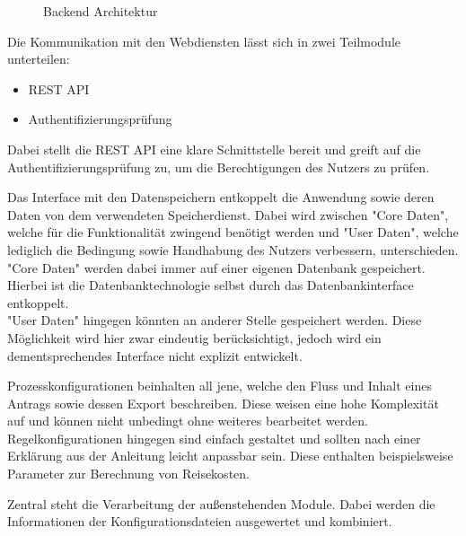 \begin{figure}[h]
    
    \caption{Backend Architektur}\label{fig:BackendArch}
\end{figure}

Die Kommunikation mit den Webdiensten lässt sich in zwei Teilmodule unterteilen:
\begin{itemize}
    \item \ac{REST} \ac{API}
    \item Authentifizierungsprüfung
\end{itemize}
Dabei stellt die \ac{REST} \ac{API} eine klare Schnittstelle bereit und greift auf die Authentifizierungsprüfung zu,
um die Berechtigungen des Nutzers zu prüfen.

Das Interface mit den Datenspeichern entkoppelt die Anwendung sowie deren Daten von dem verwendeten Speicherdienst.
Dabei wird zwischen "Core Daten", welche für die Funktionalität zwingend benötigt werden
und "User Daten", welche lediglich die Bedingung sowie Handhabung des Nutzers verbessern, unterschieden.\\
"Core Daten" werden dabei immer auf einer eigenen Datenbank gespeichert.
Hierbei ist die Datenbanktechnologie selbst durch das Datenbankinterface entkoppelt.\\
"User Daten" hingegen könnten an anderer Stelle gespeichert werden.
Diese Möglichkeit wird hier zwar eindeutig berücksichtigt, jedoch wird ein dementsprechendes Interface nicht explizit entwickelt.

Prozesskonfigurationen beinhalten all jene, welche den Fluss und Inhalt eines Antrags sowie dessen Export beschreiben.
Diese weisen eine hohe Komplexität auf und können nicht unbedingt ohne weiteres bearbeitet werden.
Regelkonfigurationen hingegen sind einfach gestaltet und sollten nach einer Erklärung aus der Anleitung leicht anpassbar sein.
Diese enthalten beispielsweise Parameter zur Berechnung von Reisekosten.

Zentral steht die Verarbeitung der außenstehenden Module.
Dabei werden die Informationen der Konfigurationsdateien ausgewertet und kombiniert.